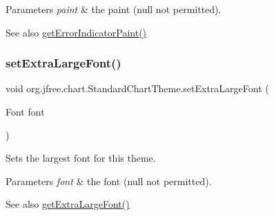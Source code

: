 \begin{DoxyParams}{Parameters}
{\em paint} & the paint ({\ttfamily null} not permitted).\\
\hline
\end{DoxyParams}
\begin{DoxySeeAlso}{See also}
\mbox{\hyperlink{classorg_1_1jfree_1_1chart_1_1_standard_chart_theme_a4dc50edcfef0ad19319267af81788654}{get\+Error\+Indicator\+Paint()}} 
\end{DoxySeeAlso}
\mbox{\label{classorg_1_1jfree_1_1chart_1_1_standard_chart_theme_adccbed6b93551e77c4432d4952ffac12}} 
\subsubsection{\texorpdfstring{set\+Extra\+Large\+Font()}{setExtraLargeFont()}}
{\footnotesize\ttfamily void org.\+jfree.\+chart.\+Standard\+Chart\+Theme.\+set\+Extra\+Large\+Font (\begin{DoxyParamCaption}\item[{Font}]{font }\end{DoxyParamCaption})}

Sets the largest font for this theme.


\begin{DoxyParams}{Parameters}
{\em font} & the font ({\ttfamily null} not permitted).\\
\hline
\end{DoxyParams}
\begin{DoxySeeAlso}{See also}
\mbox{\hyperlink{classorg_1_1jfree_1_1chart_1_1_standard_chart_theme_acf811e55b1bbf7d66303013514a9c500}{get\+Extra\+Large\+Font()}} 
\end{DoxySeeAlso}
\mbox{\label{classorg_1_1jfree_1_1chart_1_1_standard_chart_theme_aec5241d250f54281250b41e088b8fbd6}} 
